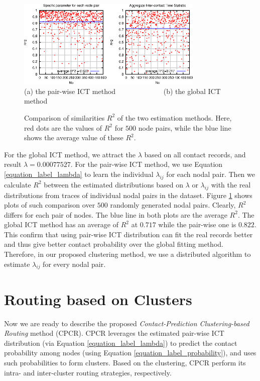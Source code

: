 \documentclass[conference]{IEEEtran}
\begin{document}
\begin{figure}[!h]
\centering
  \includegraphics[width=3.5in]{figures_1/R2_comprision.eps}\\
  (a) the pair-wise ICT method \ \ \ \ \ \ \ \ \ \ \ \ \ (b) the global ICT method
  \caption{Comparison of similarities $R^2$ of the two estimation methods. Here, red dots are the values of $R^2$ for $500$ node pairs, while the blue line shows the average value of these $R^2$.}\label{figure_label_Comparison_between_R2}
\end{figure}

For the global ICT method,  we attract the $\lambda$ based on all contact records, and result $\lambda= 0.00077527$. For the pair-wise ICT method, we use Equation  \ref{equation_label_lambda} to learn the individual $\lambda_{ij}$ for each nodal pair. Then we calculate  $R^{2}$  between the estimated distributions based on $\lambda$ or $\lambda_{ij}$ with the real distributions from traces of individual nodal pairs in the dataset. Figure \ref{figure_label_Comparison_between_R2} shows plots of such comparison over  $500$ randomly generated nodal pairs. Clearly, $R^{2}$ differs for each pair of nodes. The blue line in both plots are the average $R^{2}$. The global ICT method has an average of $R^{2}$ at $0.717$ while the pair-wise one is $0.822$. This confirm that using pair-wise ICT distribution can fit the real records better and thus give better contact probability over the global fitting method. Therefore, in our proposed clustering method, we use a distributed algorithm to estimate $\lambda_{ij}$ for every nodal pair.

\section{Routing based on Clusters}
\label{Section4_algorithm}

Now we are ready to describe the proposed \emph{Contact-Prediction Clustering-based Routing} method (CPCR).
CPCR leverages the estimated pair-wise ICT distribution (via Equation \ref{equation_label_lambda}) to predict the contact probability among nodes (using Equation \ref{equation_label_probability}), and uses such probabilities to form clusters. Based on the clustering,
CPCR perform its intra- and inter-cluster routing strategies, respectively.
\end{document}

